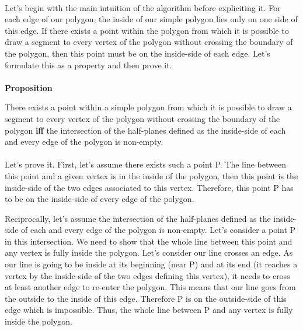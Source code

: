\paragraph{}
Let's begin with the main intuition of the algorithm before expliciting it. For each edge of our polygon, the inside of our simple polygon lies only on one side of this edge. If there exists a point within the polygon from which it is possible to draw a segment to every vertex of the polygon without crossing the boundary of the polygon, then this point must be on the inside-side of each edge. Let's formulate this as a property and then prove it.

\paragraph{}
\textbf{Proposition}

There exists a point within a simple polygon from which it is possible to draw a segment to every vertex of the polygon without crossing the boundary of the polygon \textbf{iff} the intersection of the half-planes defined as the inside-side of each and every edge of the polygon is non-empty.

\paragraph{}
Let's prove it. First, let's assume there exists such a point P. The line between this point and a given vertex is in the inside of the polygon, then this point is the inside-side of the two edges associated to this vertex. Therefore, this point P has to be on the inside-side of every edge of the polygon.

Reciprocally, let's assume the intersection of the half-planes defined as the inside-side of each and every edge of the polygon is non-empty. Let's consider a point P in this intersection. We need to show that the whole line between this point and any vertex is fully inside the polygon.
Let's consider our line crosses an edge. As our line is going to be inside at its beginning (near P) and at its end (it reaches a vertex by the inside-side of the two edges defining this vertex), it needs to cross at least another edge to re-enter the polygon. This means that our line goes from the outside to the inside of this edge. Therefore P is on the outside-side of this edge which is impossible. Thus, the whole line between P and any vertex is fully inside the polygon.

